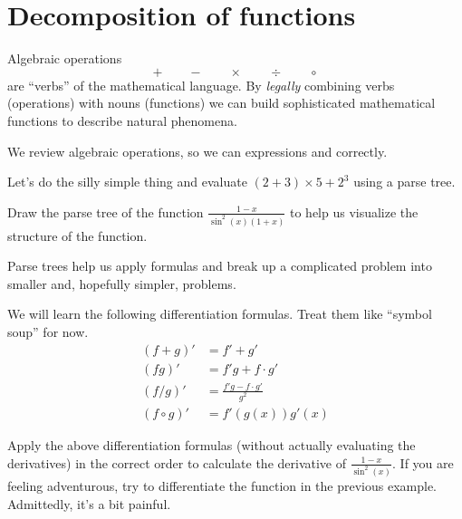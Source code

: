 \documentclass[../main.tex]{subfiles}
\begin{document}
 \section{Decomposition of functions}
Algebraic operations \[+ \qquad - \qquad \times \qquad \div \qquad \circ\] are ``verbs'' of the mathematical language. By \emph{legally} combining verbs (operations) with nouns (functions) we can build sophisticated mathematical functions to describe natural phenomena. 

We review algebraic operations, so we can  expressions and  correctly.



\begin{example}
  Let's do the silly simple thing and evaluate \((2 + 3) \times 5 + 2^{3}\) using a parse tree.

\end{example}

\begin{example} 
  Draw the parse tree of the function \(\frac{1 - x}{\sin^{2}(x) (1+x)}\) to help us visualize the structure of the function.

\end{example}
\clearpage

Parse trees help us apply formulas  and break up a complicated problem into smaller and, hopefully simpler, problems.

We will learn the following differentiation formulas.  Treat them like ``symbol soup'' for now. 
\begin{align*}
  (f+g)' &= f' + g' \\
  (fg)' &= f'g + f \cdot g' \\
  (f/g)' &= \frac{f'g - f \cdot g'}{g^{2}} \\
  (f \circ g)' &= f'(g(x)) g'(x)
\end{align*}

\begin{example}
  Apply the above differentiation formulas (without actually evaluating the derivatives) in the correct order to calculate the derivative of \(\frac{1-x}{\sin^{2}(x)}\).  \newline
  {\scriptsize If you are feeling adventurous, try to differentiate the function in the previous example. Admittedly, it's a bit painful.}

\end{example}
\end{document}
